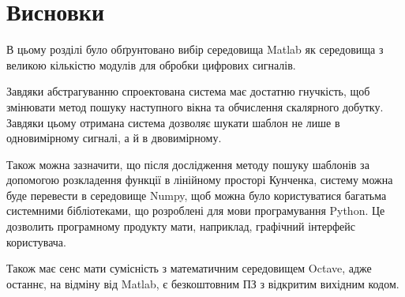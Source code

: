 \section{Висновки}
    В цьому розділі було обґрунтовано вибір середовища Matlab як середовища з великою кількістю модулів для обробки
    цифрових сигналів.

    Завдяки абстрагуванню спроектована система має достатню гнучкість, щоб змінювати метод пошуку наступного вікна та
    обчислення скалярного добутку.
    Завдяки цьому отримана система дозволяє шукати шаблон не лише в одновимірному сигналі, а й в двовимірному.

    Також можна зазначити, що після дослідження методу пошуку шаблонів за допомогою розкладення функції в лінійному
    просторі Кунченка, систему можна буде перевести в середовище Numpy, щоб можна було користуватися багатьма
    системними бібліотеками, що розроблені для мови програмування Python.
    Це дозволить програмному продукту мати, наприклад, графічний інтерфейс користувача.

    Також має сенс мати сумісність з математичним середовищем Octave, адже останнє, на відміну від Matlab, є
    безкоштовним ПЗ з відкритим вихідним кодом.


